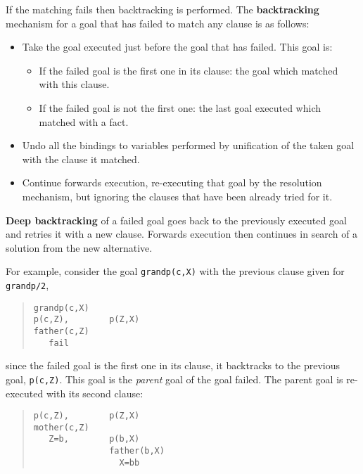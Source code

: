 If the matching fails then backtracking is performed. The 
{\bf backtracking} mechanism for a goal that has failed to match 
any clause is as follows: 
\begin{itemize}
\item Take the goal executed just before the goal that has failed.
  This goal is:
  \begin{itemize}
  \item If the failed goal is the first one in its clause: the goal
    which matched with this clause.
  \item If the failed goal is not the first one: the last goal
    executed which matched with a fact.
\end{itemize}
\item Undo all the bindings to variables performed by unification of
  the taken goal with the clause it matched.
\item Continue forwards execution, re-executing that goal by the
  resolution mechanism, but ignoring the clauses that have been
  already tried for it.
\end{itemize}

{\bf Deep backtracking} of a failed goal goes back to the previously
executed goal and retries it with a new clause. Forwards execution
then continues in search of a solution from the new alternative.

For example, consider the goal \verb+grandp(c,X)+ with the previous
clause given for \verb+grandp/2+,
\begin{quote}
\begin{verbatim}
grandp(c,X)
p(c,Z),        p(Z,X)
father(c,Z)
   fail
\end{verbatim}
\end{quote}
%
since the failed goal is the first one in its clause, it backtracks to
the previous goal, \verb+p(c,Z)+. This goal is the {\em parent} goal
of the goal failed. The parent goal is re-executed with its second
clause: 
\begin{quote}
\begin{verbatim}
p(c,Z),        p(Z,X)
mother(c,Z)
   Z=b,        p(b,X)
               father(b,X)
                 X=bb
\end{verbatim}
\end{quote}


